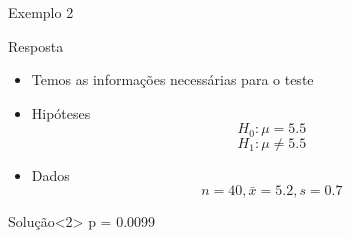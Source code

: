 \documentclass{beamer}
\begin{document}

\begin{frame}{Exemplo 2}
  \begin{exampleblock}{Resposta}
    \begin{itemize}
    \footnotesize
  \item Temos as informações necessárias para o teste
  \item Hipóteses
      \begin{displaymath}
        H_0: \mu = 5.5
      \end{displaymath}
      \begin{displaymath}
        H_1: \mu \ne 5.5
      \end{displaymath}
    \item Dados
      \begin{displaymath}
        n=40, \bar{x} = 5.2, s = 0.7
      \end{displaymath}
    \end{itemize}
  \end{exampleblock}
  \begin{exampleblock}{Solução}<2>
    p = 0.0099
  \end{exampleblock}
\end{frame}
\end{document}
